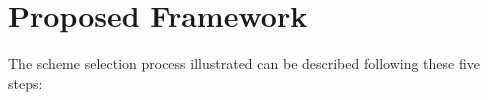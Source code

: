 \section{Proposed Framework} \label{sec:Approach}






The scheme selection process illustrated  can be described following these five steps:


